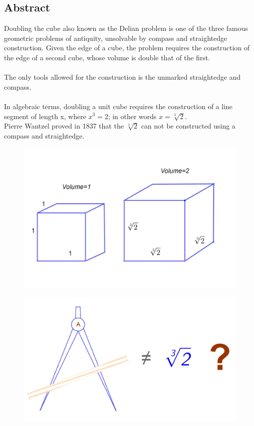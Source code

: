 \documentclass[12pt, letterpaper, oneside]{report}
\begin{document}
\begin{center}
\section*{Abstract}
\end{center}
Doubling the cube also known as the Delian problem is one of the three famous geometric problems of antiquity, unsolvable by compass and straightedge construction. Given the edge of a cube, the problem requires the construction of the edge of a second cube, whose volume is double that of the first.\\
\\
The only tools allowed for the construction is the unmarked straightedge and compass.\\
\\
In algebraic terms, doubling a unit cube requires the construction of a line segment of length x, where $x^{3} = 2$; in other words $x =\sqrt[3]{2}$.\\
Pierre Wantzel proved in 1837 that the $\sqrt[3]{2}$ can not be constructed using a compass and straightedge.\cite{A} \\ 
\begin{figure}[h]
	\centering
	\includegraphics[width=0.7\linewidth]{images/cubes.jpg}
	\label{fig:cubes}
\end{figure}
\begin{figure}[h]
	\centering
	\includegraphics[width=0.8\linewidth]{images/compass.jpg}
	\label{fig:compass}
\end{figure}
\newpage
\end{document}
